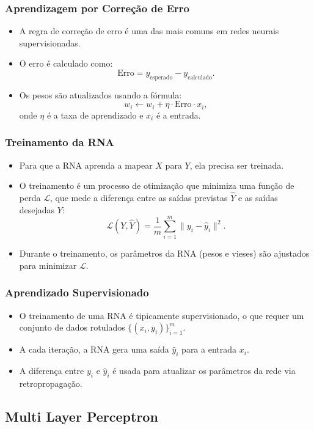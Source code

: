 \documentclass{beamer}
\begin{document}
\begin{frame}
\frametitle{Aprendizagem por Correção de Erro}
\begin{itemize}
    \item A regra de correção de erro é uma das mais comuns em redes neurais supervisionadas.
    \item O erro é calculado como:
    \[
    \text{Erro} = y_{\text{esperado}} - y_{\text{calculado}}.
    \]
    \item Os pesos são atualizados usando a fórmula:
    \[
    w_i \leftarrow w_i + \eta \cdot \text{Erro} \cdot x_i,
    \]
    onde \( \eta \) é a taxa de aprendizado e \( x_i \) é a entrada.
\end{itemize}
\end{frame}

\begin{frame}
\frametitle{Treinamento da RNA}
\begin{itemize}
    \item Para que a RNA aprenda a mapear \( X \) para \( Y \), ela precisa ser treinada.
    \item O treinamento é um processo de otimização que minimiza uma função de perda \( \mathcal{L} \), que mede a diferença entre as saídas previstas \( \hat{Y} \) e as saídas desejadas \( Y \):
    \[
    \mathcal{L}(Y, \hat{Y}) = \frac{1}{m} \sum_{i=1}^m \| y_i - \hat{y}_i \|^2.
    \]
    \item Durante o treinamento, os parâmetros da RNA (pesos e vieses) são ajustados para minimizar \( \mathcal{L} \).
\end{itemize}
\end{frame}

\begin{frame}
\frametitle{Aprendizado Supervisionado}
\begin{itemize}
    \item O treinamento de uma RNA é tipicamente supervisionado, o que requer um conjunto de dados rotulados \( \{(x_i, y_i)\}_{i=1}^m \).
    \item A cada iteração, a RNA gera uma saída \( \hat{y}_i \) para a entrada \( x_i \).
    \item A diferença entre \( y_i \) e \( \hat{y}_i \) é usada para atualizar os parâmetros da rede via retropropagação.
\end{itemize}
\end{frame}


\subsection{Multi Layer Perceptron}
\end{document}
